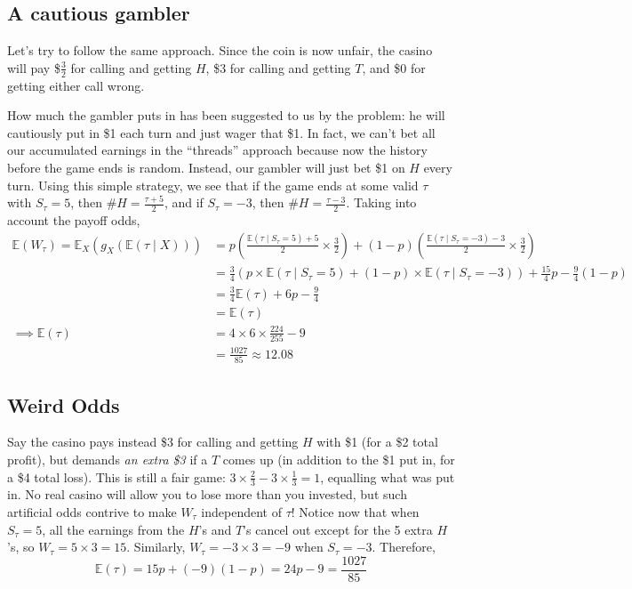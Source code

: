 \documentclass[11pt]{article}
\newcommand{\E}{\mathbb{E}}
\begin{document}
\subsection{A cautious gambler}
Let's try to follow the same approach. Since the coin is now unfair, the casino will pay \$$\frac{3}{2}$ for calling and getting $H$, \$3 for calling and getting $T$, and \$0 for getting either call wrong. 

How much the gambler puts in has been suggested to us by the problem: he will cautiously put in \$1 each turn and just wager that \$1. In fact, we can't bet all our accumulated earnings in the ``threads'' approach because now the history before the game ends is random. Instead, our gambler will just bet \$1 on $H$ every turn. Using this simple strategy, we see that if the game ends at some valid $\tau$ with $S_\tau = 5$, then $\#H = \frac{\tau+5}{2}$, and if $S_\tau = -3$, then $\#H = \frac{\tau-3}{2}$. Taking into account the payoff odds,
\begin{align*}
\E(W_\tau) = \E_X(g_X(\E(\tau\mid X))) &= p\left(\frac{\E(\tau\mid S_\tau=5)+5}{2} \times \frac{3}{2}\right) + (1-p)\left(\frac{\E(\tau\mid S_\tau=-3)-3}{2} \times \frac{3}{2}\right) \\
&= \frac{3}{4}\left(p\times\E(\tau\mid S_\tau=5) + (1-p)\times\E(\tau\mid S_\tau=-3)\right) + \frac{15}{4}p - \frac{9}{4} (1-p) \\
&= \frac{3}{4}\E(\tau) + 6p - \frac{9}{4} \\
&= \E(\tau) \\
\implies \E(\tau) &= 4 \times 6 \times \frac{224}{255} - 9 \\
&= \boxed{\frac{1027}{85}} \approx 12.08
\end{align*}

\subsection{Weird Odds}
Say the casino pays instead \$3 for calling and getting $H$ with \$1 (for a \$2 total profit), but demands \emph{an extra \$3} if a $T$ comes up (in addition to the \$1 put in, for a \$4 total loss). This is still a fair game: $3\times \frac{2}{3} - 3\times\frac{1}{3} = 1$, equalling what was put in. No real casino will allow you to lose more than you invested, but such artificial odds contrive to make $W_\tau$ independent of $\tau$! Notice now that when $S_\tau = 5$, all the earnings from the $H$'s and $T$'s cancel out except for the 5 extra $H$'s, so $W_\tau = 5 \times 3 = 15$. Similarly, $W_\tau = -3 \times 3 = -9$ when $S_\tau = -3$. Therefore, $$\E(\tau) = 15p + (-9)(1-p) = 24p - 9 = \boxed{\frac{1027}{85}}$$
\end{document}
